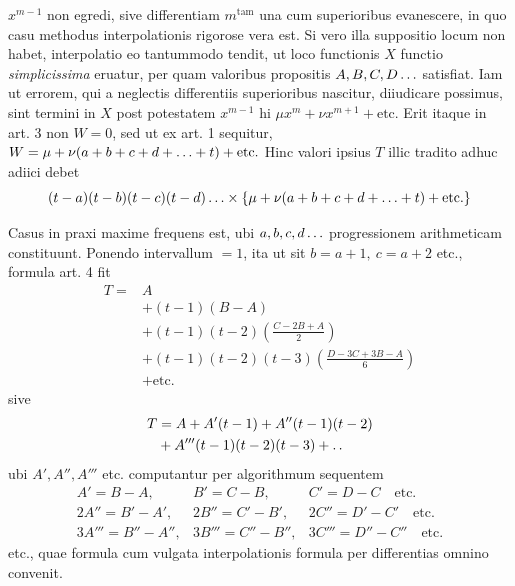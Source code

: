 $x^{m-1}$ non egredi, sive differentiam $m^{\mathrm{tam}}$ una cum superioribus evanescere, in
quo casu methodus interpolationis rigorose vera est. Si vero illa suppositio locum
non habet, interpolatio eo tantummodo tendit, ut loco functionis $X$ functio \textit{simplicissima} eruatur, per quam valoribus propositis $A,B,C,D\mathinner{.\,.\,.}$ satisfiat. Iam
ut errorem, qui a neglectis differentiis superioribus nascitur, diiudicare possimus,
sint termini in \(X\) post potestatem \(x^{m-1}\) hi \(\mu x^m+\nu x^{m+1}+\text{etc.}\) Erit itaque in art. 3
non \(W=0\), sed ut ex art. 1 sequitur, \(W=\mu+\nu(a+b+c+d+\mathinner{.\,.\,.}+t)+\text{etc.}\)
Hinc valori ipsius \(T\) illic tradito adhuc adiici debet
\[
(t-a)(t-b)(t-c)(t-d)\mathinner{.\,.\,.}\times\{\mu+\nu(a+b+c+d+\mathinner{.\,.\,.}+t)+\text{etc.}\}
\]

Casus in praxi maxime frequens est, ubi \(a,b,c,d\mathinner{.\,.\,.}\) progressionem arithmeticam constituunt. Ponendo intervallum \(=1\), ita ut sit \(b=a+1,\ c=a+2\)
etc., formula art. 4 fit
\[
\begin{aligned}
T={}&A\\
&+(t-1)(B-A)\\
&+(t-1)(t-2)\left(\frac{C-2B+A}{2}\right)\\
&+(t-1)(t-2)(t-3)\left(\frac{D-3C+3B-A}{6}\right)\\
&+\text{etc.}
\end{aligned}
\]
sive
\[\begin{aligned}
T&=A+A'(t-1)+A''(t-1)(t-2)\\&+A'''(t-1)(t-2)(t-3)+\mathinner{.\,.}
\end{aligned}\]
ubi \(A',A'',A'''\) etc. computantur per algorithmum sequentem
\[
\begin{array}{lll}
A'=B-A,&B'=C-B,&C'=D-C\quad\text{etc.}\\
2A''=B'-A',&2B''=C'-B',&2C''=D'-C'\quad\text{etc.}\\
3A'''=B''-A'',&3B'''=C''-B'',&3C'''=D''-C''\quad\text{etc.}
\end{array}
\]
etc., quae formula cum vulgata interpolationis formula per differentias omnino
convenit.

